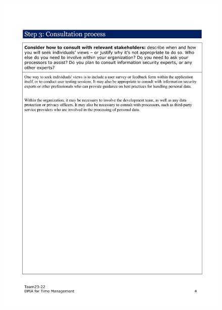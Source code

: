 \documentclass[a4paper]{article}
\begin{document}
\begin{figure}[H]
	\centering
	\includegraphics[width=1\textwidth]{./images/DPIA-Team23-22/DPIA-Team23-22_4.pdf}
	\label{Fig.DPIA_4}
\end{figure}
\end{document}

